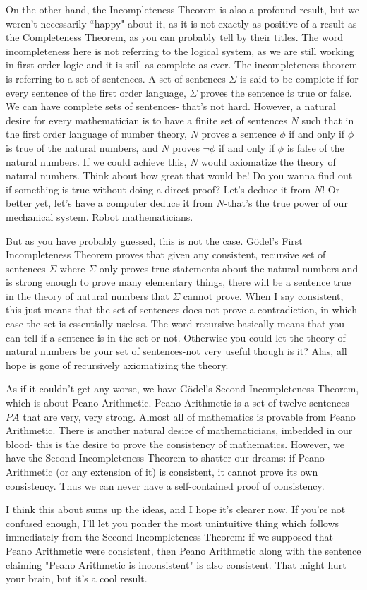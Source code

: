 \documentclass[11pt]{hmcpset}
\newenvironment{problem1}[1]{\noindent {\bf Problem #1}}
{\medskip}
\begin{document}
\begin{problem1}{5}
On the other hand, the Incompleteness Theorem is also a profound result, but we weren't necessarily ``happy" about it, as it is not exactly as positive of a result as the Completeness Theorem, as you can probably tell by their titles. The word incompleteness here is not referring to the logical system, as we are still working in first-order logic and it is still as complete as ever. The incompleteness theorem is referring to a set of sentences. A set of sentences $\Sigma$ is said to be complete if for every sentence of the first order language, $\Sigma$ proves the sentence is true or false. We can have complete sets of sentences- that's not hard. However, a natural desire for every mathematician is to have a finite set of sentences $N$ such that in the first order language of number theory, $N$ proves a sentence $\phi$ if and only if $\phi$ is true of the natural numbers, and $N$ proves $\neg\phi$ if and only if $\phi$ is false of the natural numbers. If we could achieve this, $N$ would axiomatize the theory of natural numbers. Think about how great that would be! Do you wanna find out if something is true without doing a direct proof? Let's deduce it from $N$! Or better yet, let's have a computer deduce it from $N$-that's the true power of our mechanical system. Robot mathematicians.

But as you have probably guessed, this is not the case. G\"odel's First Incompleteness Theorem proves that given any consistent, recursive set of sentences $\Sigma$ where $\Sigma$ only proves true statements about the natural numbers and is strong enough to prove many elementary things, there will be a sentence true in the theory of natural numbers that $\Sigma$ cannot prove. When I say consistent, this just means that the set of sentences does not prove a contradiction, in which case the set is essentially useless. The word recursive basically means that you can tell if a sentence is in the set or not. Otherwise you could let the theory of natural numbers be your set of sentences-not very useful though is it? Alas, all hope is gone of recursively axiomatizing the theory.

As if it couldn't get any worse, we have G\"odel's Second Incompleteness Theorem, which is about Peano Arithmetic. Peano Arithmetic is a set of twelve sentences $PA$ that are very, very strong. Almost all of mathematics is provable from Peano Arithmetic. There is another natural desire of mathematicians, imbedded in our blood- this is the desire to prove the consistency of mathematics. However, we have the Second Incompleteness Theorem to shatter our dreams: if Peano Arithmetic (or any extension of it) is consistent, it cannot prove its own consistency.  Thus we can never have a self-contained proof of consistency.

I think this about sums up the ideas, and I hope it's clearer now. If you're not confused enough, I'll let you ponder the most unintuitive thing which follows immediately from the Second Incompleteness Theorem: if we supposed that Peano Arithmetic were consistent, then Peano Arithmetic along with the sentence claiming "Peano Arithmetic is inconsistent" is also consistent. That might hurt your brain, but it's a cool result.

\end{problem1}
\end{document}
